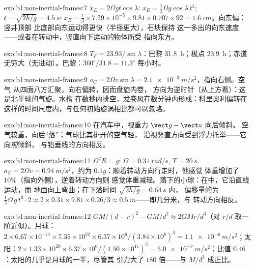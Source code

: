 \begin{solution}{exo:b1:non-inertial-frames:7}
$\ddot x_E = 2\Omega gt\cos\lambda$: $x_E = \tfrac13\Omega g\cos\lambda\,t^3$; $t =
\sqrt{2h/g} = \qty{4.5}{s}$: $x_E = \tfrac13 \times 7.29\times10^{-5} \times 9.81
\times 0.707 \times 92 = \qty{1.6}{cm}$。向东偏：竖井顶部
比底部向东运动得更快（半径更大），石块保持
这一多出的向东速度——或者在转动中，竖直向下运动的物体所受
指向东方。
\end{solution}

\begin{solution}{exo:b1:non-inertial-frames:8}
$T_F = 23.93/\sin\lambda$：巴黎 \qty{31.8}{h}；极点 \qty{23.9}{h}；赤道
无穷大（无进动）。巴黎：$360^\circ/31.8 = 11.3^\circ$ 每小时。
\end{solution}

\begin{solution}{exo:b1:non-inertial-frames:9}
$a_C = 2\Omega v\sin\lambda = \qty{2.1e-3}{m/s^2}$，指向右侧。空气
从四面八方汇聚，向右偏转，因而盘旋内卷，
方向为逆时针（从上方看）：这是北半球的气旋。水槽
在数秒内排空，龙卷风在数分钟内形成：科里奥利偏转在
这样的时间尺度内，与任何初始旋涡相比都可以忽略。
\end{solution}

\begin{solution}{exo:b1:non-inertial-frames:10}
在汽车中，视重力 $\vect g - \vect a$ 向后倾斜。
空气较重，向后“落”；气球比其排开的空气轻，
沿视竖直方向受到浮力托举——它向\emph{前}倾斜，
与铅垂线的方向相反。
\end{solution}

\begin{solution}{exo:b1:non-inertial-frames:11}
$\Omega^2R = g$: $\Omega = \qty{0.31}{rad/s}$, $T = \qty{20}{s}$. $a_C = 2\Omega v
= \qty{0.94}{m/s^2}$，约为 $0.1g$：顺着转动方向行走时，他感觉
体重增加了 $10\%$（指向外侧），逆着转动方向则
感觉体重减轻。落下的小球：在中，它沿直线运动，而
地面向上弯曲；在下落时间 $\sqrt{2h/g} = \qty{0.64}{s}$ 内，
偏移量的为 $\tfrac13\Omega\,g\,t^3 \cdot 2 \approx 2 \times 0.31 \times
9.81 \times 0.26/3 \approx \qty{0.5}{m}$——即几分米，与
转动方向相反。
\end{solution}

\begin{solution}{exo:b1:non-inertial-frames:12}
$GM/(d - r)^2 - GM/d^2 \approx 2GMr/d^3$（对 $r/d$ 取一阶近似）。月球：
$2 \times 6.67\times10^{-11} \times 7.35\times10^{22} \times 6.37\times10^6/
(3.84\times10^8)^3 = \qty{1.1e-6}{m/s^2}$；太阳：$2 \times 1.33\times10^{20}
\times 6.37\times10^6/(1.50\times10^{11})^3 = \qty{5.0e-7}{m/s^2}$；比值
$0.46$：太阳的几乎是月球的一半，尽管其
引力大了 $180$ 倍——与 $M/d^3$ 成正比。
\end{solution}

